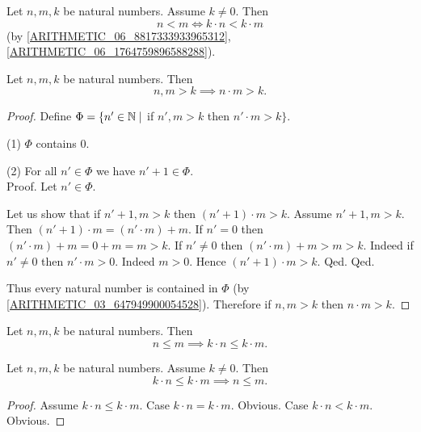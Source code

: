 \documentclass[10pt]{article}
\begin{document}
  \begin{forthel}
    \begin{corollary}
      Let $n, m, k$ be natural numbers.
      Assume $k \neq 0$.
      Then \[ n < m \iff k \cdot n < k \cdot m \]
      (by \cref{ARITHMETIC_06_8817333933965312}, \cref{ARITHMETIC_06_1764759896588288}).
    \end{corollary}
  \end{forthel}

  \begin{forthel}
    \begin{proposition}
      Let $n, m, k$ be natural numbers.
      Then \[ n, m > k \implies n \cdot m > k. \]
    \end{proposition}
    \begin{proof}
      Define $\Phi = \{ n' \in \mathbb{N} \mid$ if $n', m > k$ then $n' \cdot m > k \}$.

      (1) $\Phi$ contains $0$.

      (2) For all $n' \in \Phi$ we have $n' + 1 \in \Phi$. \\
      Proof.
        Let $n' \in \Phi$.

        Let us show that if $n' + 1, m > k$ then $(n' + 1) \cdot m > k$.
          Assume $n' + 1, m > k$.
          Then $(n' + 1) \cdot m = (n' \cdot m) + m$.
          If $n' = 0$ then
          $(n' \cdot m) + m
            = 0 + m
            = m
            > k$.
          If $n' \neq 0$ then
          $(n' \cdot m) + m
            > m
            > k$.
          Indeed if $n' \neq 0$ then $n' \cdot m > 0$.
          Indeed $m > 0$.
          Hence $(n' + 1) \cdot m > k$.
        Qed.
      Qed.

      Thus every natural number is contained in $\Phi$ (by \cref{ARITHMETIC_03_647949900054528}).
      Therefore if $n, m > k$ then $n \cdot m > k$.
    \end{proof}
  \end{forthel}

  \begin{forthel}
    \begin{corollary}
      Let $n, m, k$ be natural numbers.
      Then \[ n \leq m \implies k \cdot n \leq k \cdot m. \]
    \end{corollary}
  \end{forthel}

  \begin{forthel}
    \begin{corollary}
      Let $n, m, k$ be natural numbers.
      Assume $k \neq 0$.
      Then \[ k \cdot n \leq k \cdot m \implies n \leq m. \]
    \end{corollary}
    \begin{proof}
      Assume $k \cdot n \leq k \cdot m$.
      Case $k \cdot n = k \cdot m$. Obvious.
      Case $k \cdot n < k \cdot m$. Obvious.
    \end{proof}
  \end{forthel}
\end{document}
